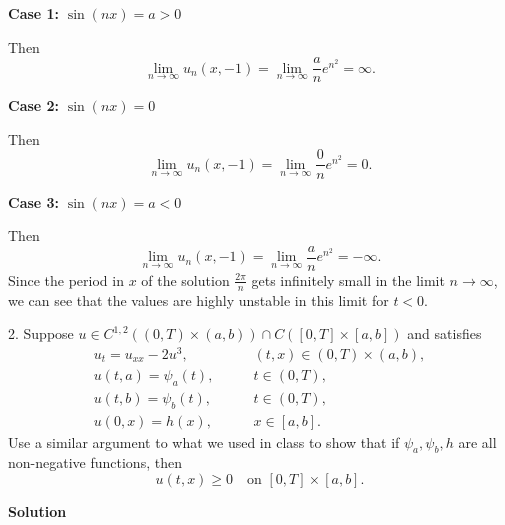 \documentclass{article}
\begin{document}
\textbf{Case 1:} $\sin(n x) = a > 0$

Then
%
\begin{equation*}
    \lim_{n \to \infty} u_n(x, -1)
        = \lim_{n \to \infty} \frac{a}{n} e^{n^2}
        = \infty
    .
\end{equation*}

\textbf{Case 2:} $\sin(n x) = 0$

Then
%
\begin{equation*}
    \lim_{n \to \infty} u_n(x, -1)
        = \lim_{n \to \infty} \frac{0}{n} e^{n^2}
        = 0
    .
\end{equation*}

\textbf{Case 3:} $\sin(n x) = a < 0$

Then
%
\begin{equation*}
    \lim_{n \to \infty} u_n(x, -1)
        = \lim_{n \to \infty} \frac{a}{n} e^{n^2}
        = - \infty
    .
\end{equation*}
%
Since the period in $x$ of the solution $\frac{2 \pi}{n}$ gets
infinitely small in the limit $n \to \infty$, we can see that the
values are highly unstable in this limit for $t < 0$.

\newpage

2. Suppose
$u \in C^{1, 2}((0, T) \times (a, b)) \cap C([0, T] \times [a, b])$ and satisfies
%
\begin{align*}
    u_t = u_{xx} - 2u^3, &\qquad (t, x) \in (0, T) \times (a, b), \\
    u(t, a) = \psi_a(t), &\qquad t \in (0, T), \\
    u(t, b) = \psi_b(t), &\qquad t \in (0, T), \\
    u(0, x) = h(x), &\qquad x \in [a, b].
\end{align*}
%
Use a similar argument to what we used in class to show that if
$\psi_a, \psi_b, h$ are all non-negative functions, then
%
\begin{equation*}
    u(t, x) \geq 0 \quad \text{on } [0, T] \times [a, b]
    .
\end{equation*}

\textbf{Solution}
\end{document}
